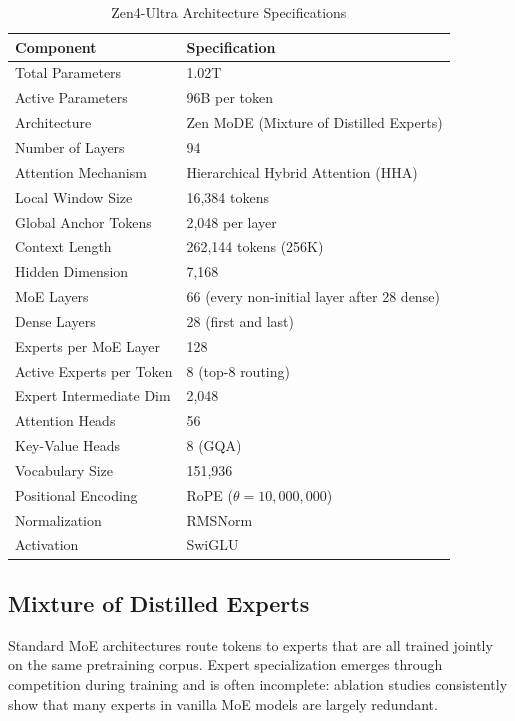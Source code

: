 \documentclass[11pt,a4paper]{article}
\begin{document}
\begin{table}[H]
\centering
\begin{tabular}{ll}
\toprule
\textbf{Component} & \textbf{Specification} \\
\midrule
Total Parameters           & 1.02T \\
Active Parameters          & 96B per token \\
Architecture               & Zen MoDE (Mixture of Distilled Experts) \\
Number of Layers           & 94 \\
Attention Mechanism        & Hierarchical Hybrid Attention (HHA) \\
Local Window Size          & 16,384 tokens \\
Global Anchor Tokens       & 2,048 per layer \\
Context Length             & 262,144 tokens (256K) \\
Hidden Dimension           & 7,168 \\
MoE Layers                 & 66 (every non-initial layer after 28 dense) \\
Dense Layers               & 28 (first and last) \\
Experts per MoE Layer      & 128 \\
Active Experts per Token   & 8 (top-8 routing) \\
Expert Intermediate Dim    & 2,048 \\
Attention Heads            & 56 \\
Key-Value Heads            & 8 (GQA) \\
Vocabulary Size            & 151,936 \\
Positional Encoding        & RoPE ($\theta = 10{,}000{,}000$) \\
Normalization              & RMSNorm \\
Activation                 & SwiGLU \\
\bottomrule
\end{tabular}
\caption{Zen4-Ultra Architecture Specifications}
\end{table}

\subsection{Mixture of Distilled Experts}

Standard MoE architectures route tokens to experts that are all trained jointly on the
same pretraining corpus. Expert specialization emerges through competition during training
and is often incomplete: ablation studies consistently show that many experts in vanilla
MoE models are largely redundant.
\end{document}
